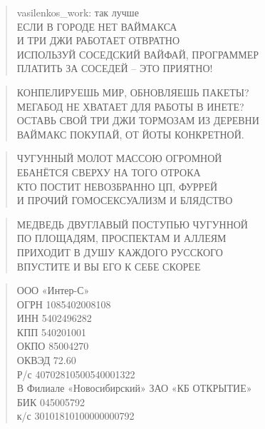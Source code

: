 \poemtitle{***}
\begin{verse}
vasilenkos\_work: так лучше\\
ЕСЛИ В ГОРОДЕ НЕТ ВАЙМАКСА\\
И ТРИ ДЖИ РАБОТАЕТ ОТВРАТНО\\
ИСПОЛЬЗУЙ СОСЕДСКИЙ ВАЙФАЙ, ПРОГРАММЕР\\
ПЛАТИТЬ ЗА СОСЕДЕЙ -- ЭТО ПРИЯТНО!
\end{verse}

\poemtitle{***}
\begin{verse}
КОНПЕЛИРУЕШЬ МИР, ОБНОВЛЯЕШЬ ПАКЕТЫ?\\
МЕГАБОД НЕ ХВАТАЕТ ДЛЯ РАБОТЫ В ИНЕТЕ?\\
ОСТАВЬ СВОЙ ТРИ ДЖИ ТОРМОЗАМ ИЗ ДЕРЕВНИ\\
ВАЙМАКС ПОКУПАЙ, ОТ ЙОТЫ КОНКРЕТНОЙ.
\end{verse}

\poemtitle{***}
\begin{verse}
ЧУГУННЫЙ МОЛОТ МАССОЮ ОГРОМНОЙ\\
ЕБАНЁТСЯ СВЕРХУ НА ТОГО ОТРОКА\\
КТО ПОСТИТ НЕВОЗБРАННО ЦП, ФУРРЕЙ\\
И ПРОЧИЙ ГОМОСЕКСУАЛИЗМ И БЛЯДСТВО
\end{verse}

\poemtitle{***}
\begin{verse}
МЕДВЕДЬ ДВУГЛАВЫЙ ПОСТУПЬЮ ЧУГУННОЙ\\
ПО ПЛОЩАДЯМ, ПРОСПЕКТАМ И АЛЛЕЯМ\\
ПРИХОДИТ В ДУШУ КАЖДОГО РУССКОГО\\
ВПУСТИТЕ И ВЫ ЕГО К СЕБЕ СКОРЕЕ
\end{verse}

\poemtitle{***}
\begin{verse}
ООО «Интер-С»\\
ОГРН 1085402008108\\
ИНН 5402496282\\
КПП 540201001\\
ОКПО 85004270\\
ОКВЭД 72.60\\
Р/с  40702810500540001322\\
В Филиале «Новосибирский» ЗАО «КБ ОТКРЫТИЕ»\\
БИК 045005792\\
к/с 30101810100000000792
\end{verse}

